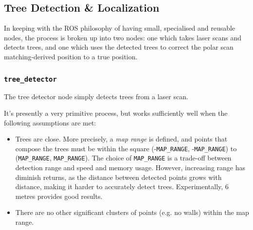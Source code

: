 \documentclass[12pt,oneside,a4paper]{book}
\begin{document}
\subsection{Tree Detection \& Localization}
\label{sec:tree-detection-localization}


In keeping with the ROS philosophy of having small, specialised and
reusable nodes, the process is broken up into two nodes: one which
takes laser scans and detects trees, and one which uses the detected
trees to correct the polar scan matching-derived position to a true
position.

\subsubsection{\texttt{tree\_detector}}
\label{sec:tree_detector}

The tree detector node simply detects trees from a laser scan.

It's presently a very primitive process, but works sufficiently well
when the following assumptions are met:
\begin{itemize}
\item Trees are close. More precisely, a \emph{map range} is defined,
  and points that compose the trees must be within the square
  (-\texttt{MAP\_RANGE}, -\texttt{MAP\_RANGE}) to (\texttt{MAP\_RANGE},
  \texttt{MAP\_RANGE}). The choice of \texttt{MAP\_RANGE} is a trade-off
  between detection range and speed and memory usage. However,
  increasing range has diminish returns, as the distance between
  detected points grows with distance, making it harder to accurately
  detect trees. Experimentally, 6 metres  provides good results.
\item There are no other significant clusters of points (e.g. no
  walls) within the map range.
\end{itemize}
\end{document}
